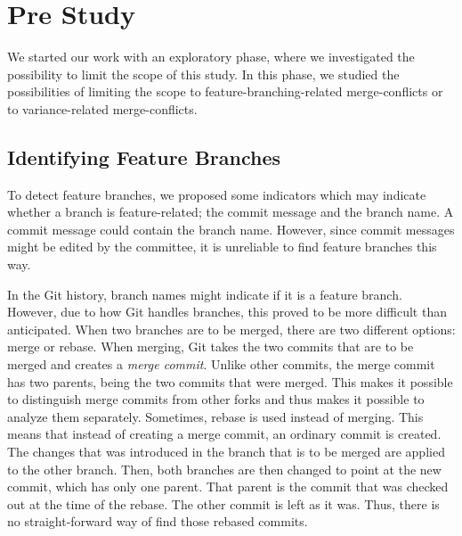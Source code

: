 \chapter{Pre Study}\label{cha:prestudy}
We started our work with an exploratory phase, where we investigated the possibility to limit the scope of this study. In this phase, we studied the possibilities of limiting the scope to feature-branching-related merge-conflicts or to variance-related merge-conflicts. 

\section{Identifying Feature Branches}\label{sec:ifb}
To detect feature branches, we proposed some indicators which may indicate whether a branch is feature-related; the commit message and the branch name. A commit message could contain the branch name. However, since commit messages might be edited by the committee, it is unreliable to find feature branches this way.

In the Git history, branch names might indicate if it is a feature branch. However, due to how Git handles branches, this proved to be more difficult than anticipated. When two branches are to be merged, there are two different options: merge or rebase. When merging, Git takes the two commits that are to be merged and creates a \textit{merge commit}. Unlike other commits, the merge commit has two parents, being the two commits that were merged. This makes it possible to distinguish merge commits from other forks and thus makes it possible to analyze them separately. Sometimes, rebase is used instead of merging. This means that instead of creating a merge commit, an ordinary commit is created. The changes that was introduced in the branch that is to be merged are applied to the other branch. Then, both branches are then changed to point at the new commit, which has only one parent. That parent is the commit that was checked out at the time of the rebase. The other commit is left as it was. Thus, there is no straight-forward way of find those rebased commits.

